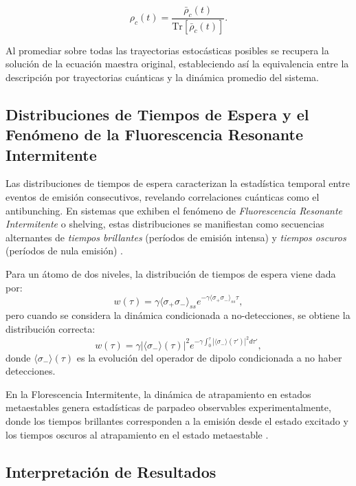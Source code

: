 \documentclass[11pt]{report}
\begin{document}
\begin{equation}
\rho_c(t)=
\frac{\bar{\rho}_c(t)}
{\mathrm{Tr}[\bar{\rho}_c(t)]}.
\end{equation}

Al promediar sobre todas las trayectorias estocásticas posibles se recupera la solución de la ecuación maestra original, estableciendo así la equivalencia entre la descripción por trayectorias cuánticas y la dinámica promedio del sistema.
\subsection*{Distribuciones de Tiempos de Espera y el Fenómeno de la Fluorescencia Resonante Intermitente}

Las distribuciones de tiempos de espera caracterizan la estadística temporal entre eventos de emisión consecutivos, revelando correlaciones cuánticas como el antibunching. En sistemas que exhiben el fenómeno de \textit{Fluorescencia Resonante Intermitente} o shelving, estas distribuciones se manifiestan como secuencias alternantes de \textit{tiempos brillantes} (períodos de emisión intensa) y \textit{tiempos oscuros} (períodos de nula emisión) \cite{Knight1990}.

Para un átomo de dos niveles, la distribución de tiempos de espera viene dada por:
\begin{equation}
w(\tau) = \gamma \langle \sigma_+\sigma_-\rangle_{ss} e^{-\gamma \langle \sigma_+\sigma_-\rangle_{ss} \tau},
\label{eq:waiting_time_2level}
\end{equation}
pero cuando se considera la dinámica condicionada a no-detecciones, se obtiene la distribución correcta:
\begin{equation}
w(\tau) = \gamma |\langle \sigma_-\rangle(\tau)|^2 e^{-\gamma \int_0^\tau |\langle \sigma_-\rangle(\tau')|^2 d\tau'},
\label{eq:waiting_time_conditional}
\end{equation}
donde $\langle \sigma_-\rangle(\tau)$ es la evolución del operador de dipolo condicionada a no haber detecciones.

En la Florescencia Intermitente, la dinámica de atrapamiento en estados metaestables genera estadísticas de parpadeo observables experimentalmente, donde los tiempos brillantes corresponden a la emisión desde el estado excitado y los tiempos oscuros al atrapamiento en el estado metaestable \cite{Wiseman1993}.

\subsection*{Interpretación de Resultados}
\end{document}
